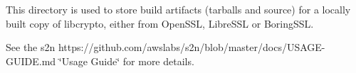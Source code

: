 This directory is used to store build artifacts (tarballs and source) for a locally built copy of libcrypto, either from Open\+S\+SL, Libre\+S\+SL or Boring\+S\+SL.

See the s2n https\+://github.com/awslabs/s2n/blob/master/docs/\+U\+S\+A\+G\+E-\/\+G\+U\+I\+D\+E.\+md \char`\"{}\+Usage Guide\char`\"{} for more details. 